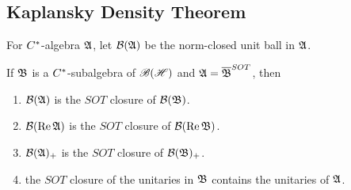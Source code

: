 \documentclass[a4paper,11pt]{report}
\begin{document}
\subsection{Kaplansky Density Theorem}

For $C^{*}$-algebra $\mathfrak{A}$, let $\mathcal{B}(\mathfrak{A})$ be the norm-closed unit ball in $\mathfrak{A}$.

\begin{thm}
	If $\mathfrak{B}$ is a $C^{*}$-subalgebra of $\mathscr{B(H)}$ and $\mathfrak{A} = \overline{\mathfrak{B}}^{SOT}$, then 
	\begin{enumerate}[label = \arabic*)]
		\item $\mathcal{B}(\mathfrak{A})$ is the $SOT$ closure of $\mathcal{B}(\mathfrak{B})$.
		\item $\mathcal{B}(\operatorname{Re}{\mathfrak{A}})$ is the $SOT$ closure of $\mathcal{B}(\operatorname{Re}{\mathfrak{B}})$.
		\item $\mathcal{B}(\mathfrak{A})_{+}$ is the $SOT$ closure of $\mathcal{B}(\mathfrak{B})_{+}$.
		\item the $SOT$ closure of the unitaries in $\mathfrak{B}$ contains the unitaries of $\mathfrak{A}$.
	\end{enumerate}
\end{thm}
\end{document}
